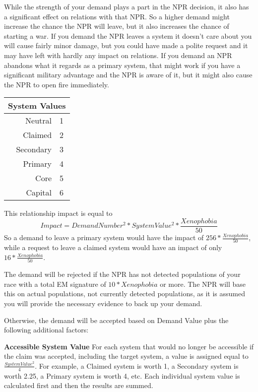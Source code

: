 \documentclass[../Aurora C# unofficial manual.tex]{subfiles}
\begin{document}
	While the strength of your demand plays a part in the NPR decision, it also has a significant effect on relations with that NPR. So a higher demand might increase the chance the NPR will leave, but it also increases the chance of starting a war. If you demand the NPR leaves a system it doesn't care about you will cause fairly minor damage, but you could have made a polite request and it may have left with hardly any impact on relations. If you demand an NPR abandons what it regards as a primary system, that might work if you have a significant military advantage and the NPR is aware of it, but it might also cause the NPR to open fire immediately.
	
	\begin{center}
		\begin{tabular}{|r|l|}
			\hline
			\multicolumn{2}{|c|}{\textbf{System Values}} \\
			\hline
			Neutral & 1 \\
			\hline
			Claimed & 2 \\
			\hline
			Secondary & 3 \\
			\hline
			Primary& 4 \\
			\hline
			Core & 5 \\
			\hline
			Capital & 6 \\
			\hline
		\end{tabular}
	\end{center}
	
	This relationship impact is equal to
	\[ Impact = Demand Number^{2} * System Value^{2} * \frac{Xenophobia}{50} \]
	So a demand to leave a primary system would have the impact of \( 256 * \frac{Xenophobia}{50} \), while a request to leave a claimed system would have an impact of only \( 16 * \frac{Xenophobia}{50} \).
	
	The demand will be rejected if the NPR has not detected populations of your race with a total EM signature of \( 10 * Xenophobia \) or more. The NPR will base this on actual populations, not currently detected populations, as it is assumed you will provide the necessary evidence to back up your demand.
	
	Otherwise, the demand will be accepted based on Demand Value plus the following additional factors:
	
	\textbf{Accessible System Value}\newline
	For each system that would no longer be accessible if the claim was accepted, including the target system, a value is assigned equal to \( \frac{System Value^{2}}{4} \). For example, a Claimed system is worth 1, a Secondary system is worth 2.25, a Primary system is worth 4, etc. Each individual system value is calculated first and then the results are summed.
	
\end{document}
